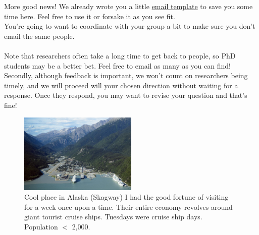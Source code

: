 \documentclass[letterpaper,11pt]{article}
\begin{document}
\begin{enumerate}
More good news! We already wrote you a little \href{https://docs.google.com/document/d/1ewTzFS7NR-LoHK8gTDOEQOODPNarIO47psnZr8DvSTQ/edit?usp=sharing}{email template} to save you some time here. Feel free to use it or forsake it as you see fit. \\
You're going to want to coordinate with your group a bit to make sure you don't email the same people. \\ \\
Note that researchers often take a long time to get back to people, so PhD students may be a better bet. Feel free to email as many as you can find!  Secondly, although feedback is important, we won't count on researchers being timely, and we will proceed will your chosen direction without waiting for a response. Once they respond, you may want to revise your question and that's fine!

\end{enumerate}

\begin{figure}[h]
\caption{Cool place in Alaska (Skagway) I had the good fortune of visiting for a week once upon a time. Their entire economy revolves around giant tourist cruise ships. Tuesdays were cruise ship days. Population $<$ 2,000.}
\centering
\includegraphics[width=0.5\textwidth]{skagway.jpg}
\end{figure}
\end{document}
